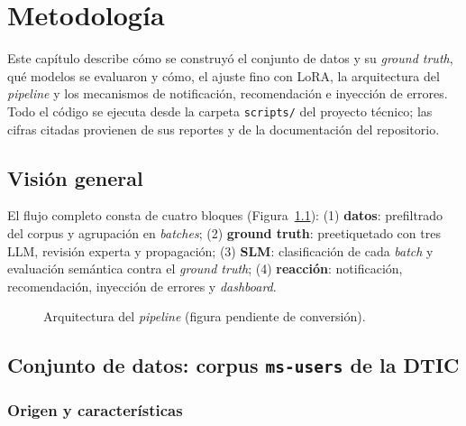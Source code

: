 \chapter{Metodología} \label{cap:metodologia}

Este capítulo describe cómo se construyó el conjunto de datos y su \textit{ground truth}, qué modelos se evaluaron y cómo, el ajuste fino con LoRA, la arquitectura del \textit{pipeline} y los mecanismos de notificación, recomendación e inyección de errores. Todo el código se ejecuta desde la carpeta \texttt{scripts/} del proyecto técnico; las cifras citadas provienen de sus reportes y de la documentación del repositorio.

\section{Visión general}\label{sec:met_vision}

El flujo completo consta de cuatro bloques (Figura~\ref{fig:arquitectura}): (1) \textbf{datos}: prefiltrado del corpus y agrupación en \textit{batches}; (2) \textbf{ground truth}: preetiquetado con tres LLM, revisión experta y propagación; (3) \textbf{SLM}: clasificación de cada \textit{batch} y evaluación semántica contra el \textit{ground truth}; (4) \textbf{reacción}: notificación, recomendación, inyección de errores y \textit{dashboard}.

\begin{figure}[H]
\centering
\caption{Arquitectura del \textit{pipeline} (figura pendiente de conversión).}
\label{fig:arquitectura}
\end{figure}

\section{Conjunto de datos: corpus \texttt{ms-users} de la DTIC}\label{sec:met_dataset}

\subsection{Origen y características}

